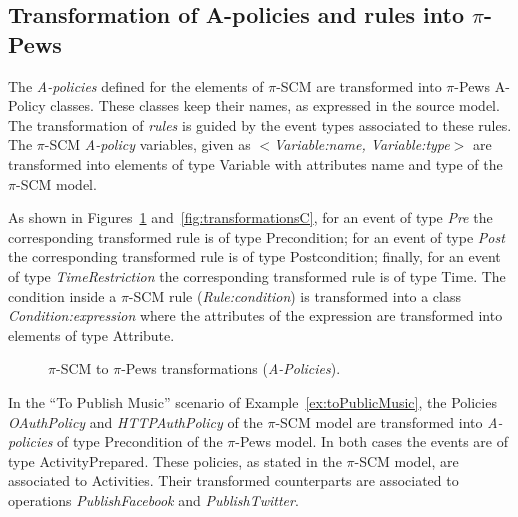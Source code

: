 \subsection{Transformation of A-policies and rules into $\pi$-{\sc Pews}}

The {\em A-policies} defined for the elements of $\pi$-SCM are transformed into $\pi$-{\sc Pews} {\sc A-Policy} classes.
These classes keep their names, as expressed in the source model. 
The transformation of \textit{rules} is guided by the event types associated to these rules.
The $\pi$-SCM {\em A-policy} variables, given as {\sc\em $<$Variable:name, Variable:type$>$} are transformed into elements of type {\sc Variable} with attributes {\sc name} and {\sc type} of the $\pi$-SCM model.

As shown in Figures~\ref{fig:transformationsB} and~\ref{fig:transformationsC}, for an event of type {\sc\em Pre} the corresponding transformed rule is of type {\sc Precondition}; for an event of type {\sc\em Post} the corresponding transformed rule is of type {\sc Postcondition}; finally, for an event of type {\sc\em TimeRestriction} the corresponding transformed rule is of type {\sc Time}. 
The condition inside a $\pi$-SCM rule ({\sc\em Rule:condition}) is transformed into a class {\sc\em Condition:expression} where the attributes of the expression are transformed into elements of type {\sc Attribute}.

\begin{figure}
\caption{ $\pi$-SCM to $\pi$-{\sc Pews} transformations (\textit{A-Policies}).}
\label{fig:transformationsB}
\end{figure}

\begin{example}
In the ``To Publish Music'' scenario of Example~\ref{ex:toPublicMusic}, the {\sf Policies} {\em OAuthPolicy} and {\em HTTPAuthPolicy} of the $\pi$-SCM model are transformed into {\em A-policies} of type {\sf Precondition} of the $\pi$-{\sc Pews} model. 
In both cases the events are of type {\sf ActivityPrepared}. 
These policies, as stated in the $\pi$-SCM model, are associated to {\sf Activities}. 
Their transformed counterparts are associated to operations {\em PublishFacebook} and {\em PublishTwitter}.
\end{example}

